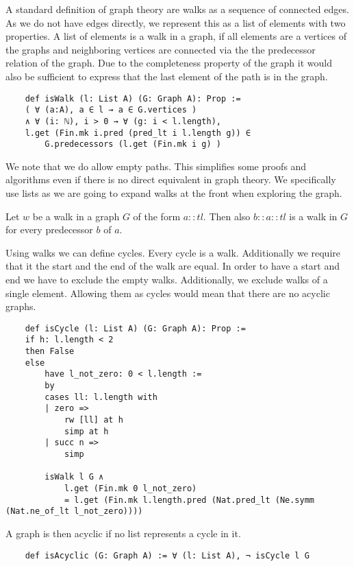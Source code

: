 A standard definition of graph theory are walks as a sequence of connected edges. As we do not have edges directly, we represent this as a list of elements with two properties. A list of elements is a walk in a graph, if all elements are a vertices of the graphs and neighboring vertices are connected via the the predecessor relation of the graph. Due to the completeness property of the graph it would also be sufficient to express that the last element of the path is in the graph. 

\begin{lstlisting}
    def isWalk (l: List A) (G: Graph A): Prop :=
    ( ∀ (a:A), a ∈ l → a ∈ G.vertices ) 
    ∧ ∀ (i: ℕ), i > 0 → ∀ (g: i < l.length), 
    l.get (Fin.mk i.pred (pred_lt i l.length g)) ∈ 
        G.predecessors (l.get (Fin.mk i g) )
\end{lstlisting}

We note that we do allow empty paths. This simplifies some proofs and algorithms even if there is no direct equivalent in graph theory. We specifically use lists as we are going to expand walks at the front when exploring the graph.  

\begin{lemma}
    Let $w$ be a walk in a graph $G$ of the form $a::tl$. Then also $b::a::tl$ is a walk in $G$ for every predecessor $b$ of $a$.
\end{lemma}

Using walks we can define cycles. Every cycle is a walk. Additionally we require that it the start and the end of the walk are equal. In order to have a start and end we have to exclude the empty walks. Additionally, we exclude walks of a single element. Allowing them as cycles would mean that there are no acyclic graphs.

\begin{lstlisting}
    def isCycle (l: List A) (G: Graph A): Prop :=
    if h: l.length < 2
    then False
    else
        have l_not_zero: 0 < l.length :=
        by
        cases ll: l.length with
        | zero =>
            rw [ll] at h
            simp at h
        | succ n =>
            simp

        isWalk l G ∧
            l.get (Fin.mk 0 l_not_zero) 
            = l.get (Fin.mk l.length.pred (Nat.pred_lt (Ne.symm (Nat.ne_of_lt l_not_zero))))
\end{lstlisting}

A graph is then acyclic if no list represents a cycle in it.

\begin{lstlisting}
    def isAcyclic (G: Graph A) := ∀ (l: List A), ¬ isCycle l G
\end{lstlisting}

